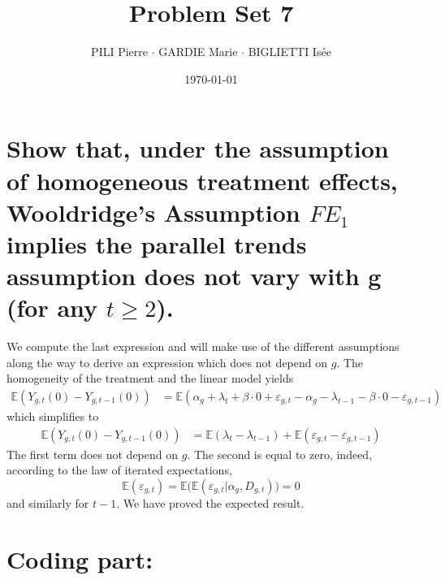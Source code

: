 \documentclass[12pt]{article}
\title{Problem Set 7}
\author{PILI Pierre $\cdot$ GARDIE Marie $\cdot$ BIGLIETTI Isée}
\date{\today}
\renewcommand{\thesubsection}{\arabic{section}.\arabic{subsection}}
\begin{document}
\maketitle
\renewcommand{\thesubsection}{\alph{subsection}}

\section{Show that, under the assumption of homogeneous treatment effects, Wooldridge’s Assumption $FE_1$ implies the parallel trends assumption does not vary with g (for any $t \geq 2$).}
We compute the last expression and will make use of the different assumptions along the way to derive an expression which does not depend on $g$. The homogeneity of the treatment and the linear model yields
\begin{align*}
    \mathbb{E}\left(Y_{g, t}(0) - Y_{g, t-1}(0)\right) &= \mathbb{E}\left(\alpha_g + \lambda_t + \beta \cdot  0 + \varepsilon_{g, t} - \alpha_g - \lambda_{t-1} - \beta \cdot 0 - \varepsilon_{g, t-1}\right) 
\end{align*}
which simplifies to
\begin{align*}
    \mathbb{E}\left(Y_{g, t}(0) - Y_{g, t-1}(0)\right) &= \mathbb{E}\left(\lambda_t - \lambda_{t-1}\right)  + \mathbb{E}\left(\varepsilon_{g, t} - \varepsilon_{g, t-1}\right) 
\end{align*}
The first term does not depend on $g$. The second is equal to zero, indeed, according to the law of iterated expectations,
$$\mathbb{E}\left(\varepsilon_{g, t}\right) = \mathbb{E}\big(\mathbb{E}(\varepsilon_{g, t}|\alpha_g, D_{g, t})\big) = 0$$
and similarly for $t-1$. We have proved the expected result.
\setcounter{section}{2}
\section{Coding part:}
\end{document}
